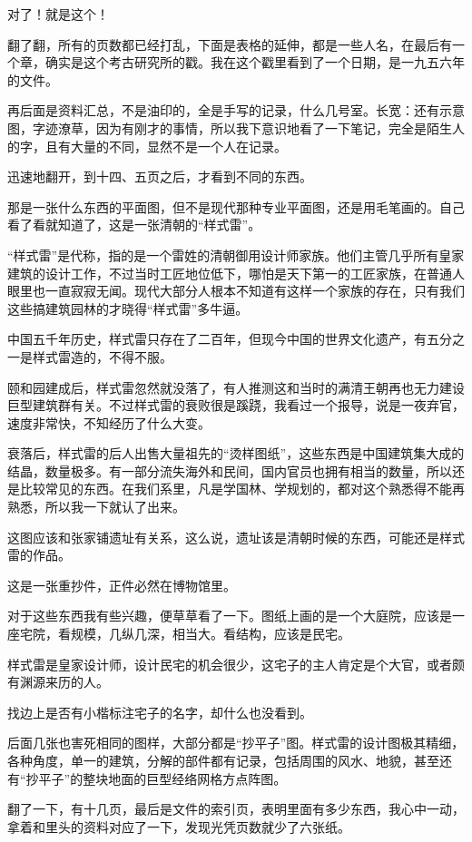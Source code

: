 对了！就是这个！

翻了翻，所有的页数都已经打乱，下面是表格的延伸，都是一些人名，在最后有一个章，确实是这个考古研究所的戳。我在这个戳里看到了一个日期，是一九五六年的文件。

再后面是资料汇总，不是油印的，全是手写的记录，什么几号室。长宽：还有示意图，字迹潦草，因为有刚才的事情，所以我下意识地看了一下笔记，完全是陌生人的字，且有大量的不同，显然不是一个人在记录。

迅速地翻开，到十四、五页之后，才看到不同的东西。

那是一张什么东西的平面图，但不是现代那种专业平面图，还是用毛笔画的。自己看了看就知道了，这是一张清朝的“样式雷”。

“样式雷”是代称，指的是一个雷姓的清朝御用设计师家族。他们主管几乎所有皇家建筑的设计工作，不过当时工匠地位低下，哪怕是天下第一的工匠家族，在普通人眼里也一直寂寂无闻。现代大部分人根本不知道有这样一个家族的存在，只有我们这些搞建筑园林的才晓得“样式雷”多牛逼。

中国五千年历史，样式雷只存在了二百年，但现今中国的世界文化遗产，有五分之一是样式雷造的，不得不服。

颐和园建成后，样式雷忽然就没落了，有人推测这和当时的满清王朝再也无力建设巨型建筑群有关。不过样式雷的衰败很是蹊跷，我看过一个报导，说是一夜弃官，速度非常快，不知经历了什么大变。

衰落后，样式雷的后人出售大量祖先的“烫样图纸”，这些东西是中国建筑集大成的结晶，数量极多。有一部分流失海外和民间，国内官员也拥有相当的数量，所以还是比较常见的东西。在我们系里，凡是学国林、学规划的，都对这个熟悉得不能再熟悉，所以我一下就认了出来。

这图应该和张家铺遗址有关系，这么说，遗址该是清朝时候的东西，可能还是样式雷的作品。

这是一张重抄件，正件必然在博物馆里。

对于这些东西我有些兴趣，便草草看了一下。图纸上画的是一个大庭院，应该是一座宅院，看规模，几纵几深，相当大。看结构，应该是民宅。

样式雷是皇家设计师，设计民宅的机会很少，这宅子的主人肯定是个大官，或者颇有渊源来历的人。

找边上是否有小楷标注宅子的名字，却什么也没看到。

后面几张也害死相同的图样，大部分都是“抄平子”图。样式雷的设计图极其精细，各种角度，单一的建筑，分解的部件都有记录，包括周围的风水、地貌，甚至还有“抄平子”的整块地面的巨型经络网格方点阵图。

翻了一下，有十几页，最后是文件的索引页，表明里面有多少东西，我心中一动，拿着和里头的资料对应了一下，发现光凭页数就少了六张纸。

